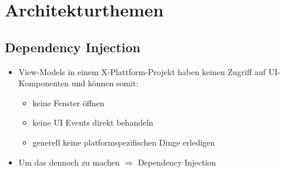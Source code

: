 \section{Architekturthemen}

\subsection{Dependency Injection}
\begin{itemize}
    \item View-Models in einem X-Plattform-Projekt haben keinen Zugriff auf UI-Komponenten und können somit:
    \begin{itemize}
        \item keine Fenster öffnen
        \item keine UI Events direkt behandeln
        \item generell keine platformspezifischen Dinge erledigen
    \end{itemize}
    \item Um das dennoch zu machen $\Rightarrow$ Dependency Injection
\end{itemize}

